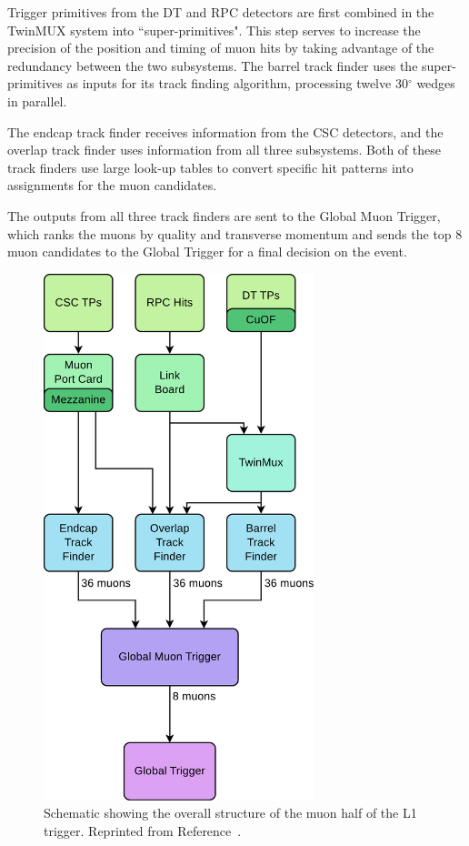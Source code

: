 Trigger primitives from the DT and RPC detectors are first combined in the TwinMUX system into ``super-primitives". This step serves to increase the precision of the position and timing of muon hits by taking advantage of the redundancy between the two subsystems.  The barrel track finder uses the super-primitives as inputs for its track finding algorithm, processing twelve 30$^{\circ}$ wedges in parallel. 

The endcap track finder receives information from the CSC detectors, and the overlap track finder uses information from all three subsystems. Both of these track finders use large look-up tables to convert specific hit patterns into \pT assignments for the muon candidates.

The outputs from all three track finders are sent to the Global Muon Trigger, which ranks the muons by quality and transverse momentum and sends the top 8 muon candidates to the Global Trigger for a final decision on the event.

\begin{figure}[h]
\begin{center}
\includegraphics[width=0.7\textwidth]{Figures/Trigger/muonL1T.pdf}
\end{center}
\caption[Schematic showing the overall structure of the muon half of the L1 trigger.]
{Schematic showing the overall structure of the muon half of the L1 trigger. Reprinted from Reference~\cite{L1twiki}.}
\label{fig:muonL1T}
\end{figure}

